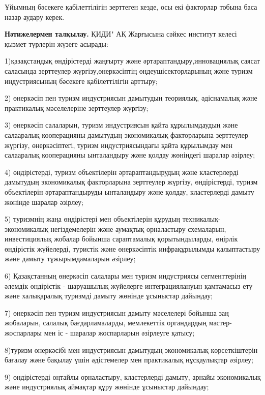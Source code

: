 \begin{multicols}{2}

Ұйымның бәсекеге қабілеттілігін зерттеген кезде, осы екі факторлар
тобына баса назар аудару керек.

{\bfseries Нәтижелермен талқылау.} ҚИДИ" АҚ Жарғысына сәйкес институт келесі
қызмет түрлерін жүзеге асырады:

1)қазақстандық өндірістерді жаңғырту және әртараптандыру,инновациялық
саясат саласында зерттеулер жүргізу,өнеркәсіптің өңдеушісекторларының
және туризм индустриясының бәсекеге қабілеттілігін арттыру;

2) өнеркәсіп пен туризм индустриясын дамытудың теориялық, әдіснамалық
және практикалық мәселелеріне зерттеулер жүргізу;

3) өнеркәсіп салаларын, туризм индустриясын қайта құрылымдаудың және
салааралық кооперацияны дамытудың экономикалық факторларына зерттеулер
жүргізу, өнеркәсіптегі, туризм индустриясындағы қайта құрылымдау мен
салааралық кооперацияны ынталандыру және қолдау жөніндегі шаралар
әзірлеу;

4) өндірістерді, туризм объектілерін әртараптандырудың және кластерлерді
дамытудың экономикалық факторларына зерттеулер жүргізу, өндірістерді,
туризм объектілерін әртараптандыруды ынталандыру және қолдау,
кластерлерді дамыту жөнінде шаралар әзірлеу;

5) туризмнің жаңа өндірістері мен объектілерін құрудың
техникалық-экономикалық негіздемелерін және аумақтық орналастыру
схемаларын, инвестициялық жобалар бойынша сараптамалық қорытындыларды,
өңірлік өндірістік жүйелерді, туристік және өнеркәсіптік инфрақұрылымды
қалыптастыру және дамыту тұжырымдамаларын әзірлеу;

6) Қазақстанның өнеркәсіп салалары мен туризм индустриясы сегменттерінің
әлемдік өндірістік - шаруашылық жүйелерге интеграциялануын қамтамасыз
ету және халықаралық туризмді дамыту жөнінде ұсыныстар дайындау;

7) өнеркәсіп пен туризм индустриясын дамыту мәселелері бойынша заң
жобаларын, салалық бағдарламаларды, мемлекеттік органдардың
мастер-жоспарлары мен іс - шаралар жоспарларын әзірлеуге қатысу;

8)туризм өнеркәсібі мен индустриясын дамытудың экономикалық
көрсеткіштерін бағалау және бақылау үшін әдістемелер мен практикалық
нұсқаулықтар әзірлеу;

9) өндірістерді оңтайлы орналастыру, кластерлерді дамыту, арнайы
экономикалық және индустриялық аймақтар құру жөнінде ұсыныстар дайындау;


\end{multicols}
